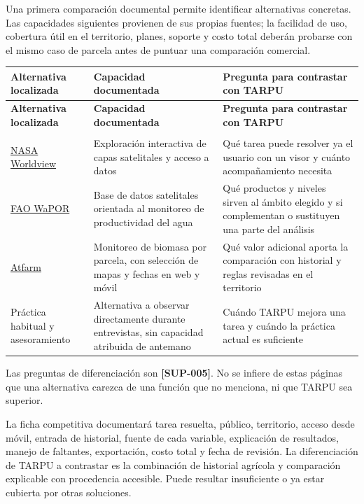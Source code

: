 \documentclass[10pt,a4paper]{article}
\begin{document}
Una primera comparación documental permite identificar alternativas concretas. Las capacidades siguientes provienen de sus propias fuentes; la facilidad de uso, cobertura útil en el territorio, planes, soporte y costo total deberán probarse con el mismo caso de parcela antes de puntuar una comparación comercial.


\begingroup\small
\begin{longtable}{>{\raggedright\arraybackslash}p{3.647cm}>{\raggedright\arraybackslash}p{5.867cm}>{\raggedright\arraybackslash}p{6.343cm}}
\toprule
\textbf{Alternativa localizada} & \textbf{Capacidad documentada} & \textbf{Pregunta para contrastar con TARPU} \\
\midrule\endfirsthead
\toprule
\textbf{Alternativa localizada} & \textbf{Capacidad documentada} & \textbf{Pregunta para contrastar con TARPU} \\
\midrule\endhead
\midrule\multicolumn{3}{r}{\scriptsize Continúa en la página siguiente}\\\endfoot
\bottomrule\endlastfoot
\href{https://www.earthdata.nasa.gov/home}{NASA Worldview} & Exploración interactiva de capas satelitales y acceso a datos & Qué tarea puede resolver ya el usuario con un visor y cuánto acompañamiento necesita \\[3pt]
\href{https://www.fao.org/land-water/resources/tools/databases/wapor/en}{FAO WaPOR} & Base de datos satelitales orientada al monitoreo de productividad del agua & Qué productos y niveles sirven al ámbito elegido y si complementan o sustituyen una parte del análisis \\[3pt]
\href{https://support.at.farm/hc/es-es/articles/18253470818332--C\%C3\%B3mo-puedo-monitorear-la-biomasa-de-mi-parcela}{Atfarm} & Monitoreo de biomasa por parcela, con selección de mapas y fechas en web y móvil & Qué valor adicional aporta la comparación con historial y reglas revisadas en el territorio \\[3pt]
Práctica habitual y asesoramiento & Alternativa a observar directamente durante entrevistas, sin capacidad atribuida de antemano & Cuándo TARPU mejora una tarea y cuándo la práctica actual es suficiente \\[3pt]
\end{longtable}
\endgroup

Las preguntas de diferenciación son \textbf{[SUP-005]}. No se infiere de estas páginas que una alternativa carezca de una función que no menciona, ni que TARPU sea superior.


La ficha competitiva documentará tarea resuelta, público, territorio, acceso desde móvil, entrada de historial, fuente de cada variable, explicación de resultados, manejo de faltantes, exportación, costo total y fecha de revisión. La diferenciación de TARPU a contrastar es la combinación de historial agrícola y comparación explicable con procedencia accesible. Puede resultar insuficiente o ya estar cubierta por otras soluciones.
\end{document}
